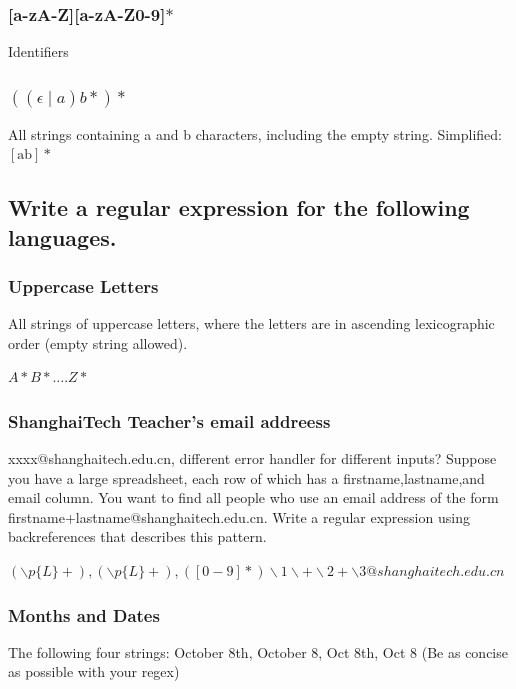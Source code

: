 \documentclass[a4paper]{exam}
\begin{document}
\subsubsection{[a-zA-Z][a-zA-Z0-9]$*$}

\begin{solution}
  Identifiers
\end{solution}
\subsubsection{$((\epsilon\mid a)b*)*$}
\begin{solution}
  All strings containing a and b characters, including the empty string. Simplified: $[\mathrm{ab}] *$
\end{solution}
\subsection{Write a regular expression for the following languages.}
\subsubsection{Uppercase Letters}
{All strings of uppercase letters, where the letters are in ascending lexicographic order (empty string allowed).}
\begin{solution}
  $A * B * \ldots . Z *$
\end{solution}
\subsubsection{ShanghaiTech Teacher's email addreess}
{xxxx@shanghaitech.edu.cn}, different error handler for different inputs? Suppose you have a large spreadsheet, each row of which has a firstname,lastname,and email column.  You want to find all people who use an email address of the form firstname+lastname@shanghaitech.edu.cn.   Write  a  regular  expression  using  backreferences that describes this pattern.
\begin{solution}
  $(\backslash p\{L\}+),(\backslash p\{L\}+),([0-9]*) \backslash 1 \backslash+\backslash 2+\backslash 3 @shanghaitech.edu.cn$
\end{solution}

\subsubsection{Months and Dates}
The following four strings: October 8th, October 8, Oct 8th, Oct 8 (Be as concise as possible with your regex)
\end{document}
